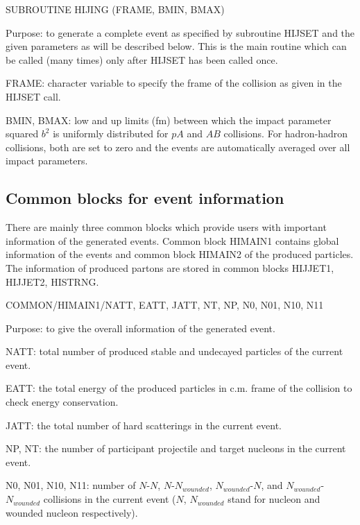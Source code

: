 \begin{description}
\itemsep=-4.0pt
\item{}SUBROUTINE  HIJING (FRAME, BMIN, BMAX)
\item{}Purpose: to generate a complete event as specified by subroutine HIJSET
                and the given parameters as will be described below.
                This is the main routine which can be called (many times) 
                only after HIJSET has been called once. 
\item{}FRAME: character variable to specify the frame of the collision
                as given in the HIJSET call.
\item{}BMIN, BMAX: low and up limits (fm) between which the impact
                parameter squared $b^2$ is uniformly distributed 
                for $pA$ and
                $AB$ collisions. For hadron-hadron collisions, both are set
                to zero and the events 
                are automatically averaged over all impact parameters.
\end{description} 


\subsection{Common blocks for event information}

        There are mainly three common blocks which provide users with
important information of the generated events. Common block HIMAIN1
contains global information of the events and common block HIMAIN2
of the produced particles. The information of produced partons are
stored in common blocks HIJJET1, HIJJET2, HISTRNG.

\begin{description}
\itemsep=-4.0pt
\item{}COMMON/HIMAIN1/NATT, EATT, JATT, NT, NP, N0, N01, N10, N11
\item{}Purpose: to give the overall information of the generated event.
\item{}NATT: total number of produced stable and undecayed particles of 
                the current event. 
\item{}EATT: the total energy of the produced particles in c.m. frame
                of the collision to check energy conservation.
\item{}JATT: the total number of hard scatterings in the current event.
\item{}NP, NT: the number of participant projectile and target nucleons
                in the current event.
\item{}N0, N01, N10, N11: number of $N$-$N$, $N$-$N_{wounded}$,
                $N_{wounded}$-$N$, and
                $N_{wounded}$-$N_{wounded}$ collisions in 
                the current event ($N$, $N_{wounded}$ stand
                for nucleon and wounded nucleon respectively).
\end{description}

